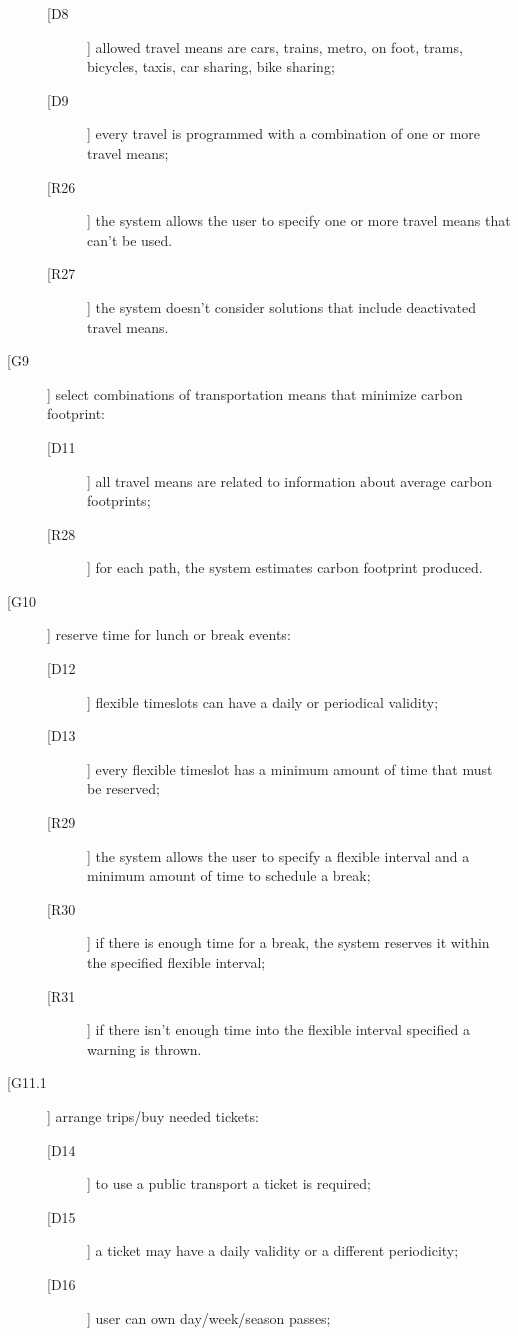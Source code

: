 \begin{description}
\begin{description}
	\item[[D8]] allowed travel means are cars, trains, metro, on foot, trams, bicycles, taxis, car sharing, bike sharing;	
	\item[[D9]] every travel is programmed with a combination of one or more travel means;
	\newline
	\item[[R26]] the system allows the user to specify one or more travel means that can’t be used.
	\item[[R27]] the system doesn’t consider solutions that include deactivated travel means.
	\end{description}
\item[[G9]] select combinations of transportation means that minimize carbon footprint:
	\begin{description}
	\item[[D11]] all travel means are related to information about average carbon footprints; 
	\newline
	\item[[R28]] for each path, the system estimates carbon footprint produced.
	\end{description}
\item[[G10]] reserve time for lunch or break events:
	\begin{description}
	\item[[D12]] flexible timeslots can have a daily or periodical validity;
	\item[[D13]] every flexible timeslot has a minimum amount of time that must be reserved;
	\newline
	\item[[R29]] the system allows the user to specify a flexible interval and a minimum amount of time to schedule a break;
	\item[[R30]] if there is enough time for a break, the system reserves it within the specified flexible interval;
	\item[[R31]] if there isn’t enough time into the flexible interval specified a warning is thrown.
	\end{description}
\item[[G11.1]] arrange trips/buy needed tickets:
	\begin{description}
	\item[[D14]] to use a public transport a ticket is required; 
	\item[[D15]] a ticket may have a daily validity or a different periodicity; 
	\item[[D16]] user can own day/week/season passes;

\end{description}
\end{description}
